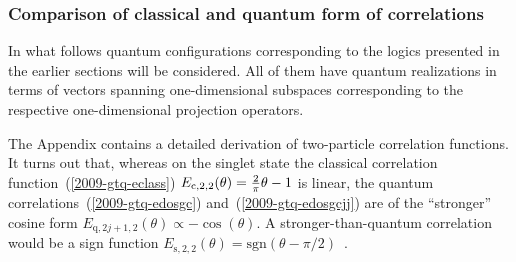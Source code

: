 \subsubsection{Comparison of classical and quantum form of correlations}

In what follows quantum configurations corresponding to the logics presented in the earlier sections will be considered.
All of them have quantum realizations in terms of vectors spanning one-dimensional subspaces
corresponding to the respective one-dimensional projection operators.

The Appendix contains a detailed derivation of two-particle correlation functions.
It turns out that, whereas on the singlet state the classical correlation function~(\ref{2009-gtq-eclass})
$
E_{\text{c},2,2}(\theta )  = {2 \over \pi}\theta - 1
$
is linear,
the quantum correlations~(\ref{2009-gtq-edosgc}) and~(\ref{2009-gtq-edosgcjj})  are of the ``stronger'' cosine form
$
E_{\text{q},2j+1,2}(\theta )\propto -\cos (\theta )
$.
A stronger-than-quantum correlation would be a sign function
$
E_{\text{s},2,2}(\theta )= \text{sgn} (\theta-\pi /2 )
$~\cite{svozil-krenn}.

